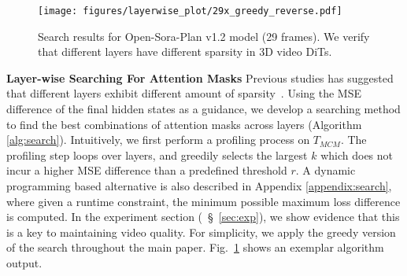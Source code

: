 \begin{figure}[ht]
\centering
\texttt{[image: figures/layerwise\_plot/29x\_greedy\_reverse.pdf]}
\caption{\small %
Search results for Open-Sora-Plan v1.2 model (29 frames). We verify that different layers have different sparsity in 3D video DiTs.}
\label{fig:exp_layerwise}
\vspace{-3mm}
\end{figure}
\textbf{Layer-wise Searching For Attention Masks} Previous studies has suggested that different layers exhibit different amount of sparsity~\citep{wang2023cuttlefish, ge2023model, yang2024pyramidinfer}. Using the MSE difference of the final hidden states %
as a guidance, %
we develop a searching method to find the best combinations of attention masks across layers (Algorithm \ref{alg:search}). Intuitively, we first perform a profiling process on $T_{MCM}$. %
The profiling step loops over layers, and greedily selects the largest $k$ %
which does not incur a higher MSE difference than a predefined threshold $r$.
A dynamic programming based alternative is also described in Appendix \ref{appendix:search}, where given a runtime constraint, the minimum possible maximum loss difference is computed. In the experiment section (~\S~\ref{sec:exp}), we show evidence that this is a key to maintaining video quality. For simplicity, we apply the greedy version of the search throughout the main paper. Fig.~\ref{fig:exp_layerwise} shows an exemplar algorithm output.


